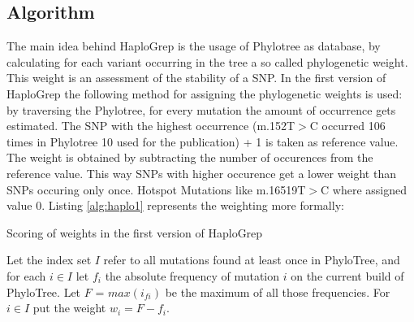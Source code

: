 \subsection{Algorithm}\label{haplo:alg}
The main idea behind HaploGrep is the usage of Phylotree as database, by calculating for each variant occurring in the tree a so called phylogenetic weight. This weight is an assessment of the stability of a SNP. In the first version of HaploGrep the following method for assigning the phylogenetic weights is used: by traversing the Phylotree, for every mutation the amount of occurrence gets estimated. The SNP with the highest occurrence (m.152T$>$C occurred 106 times in Phylotree 10 used for the publication) + 1 is taken as reference value. The weight is obtained by subtracting the number of occurences from the reference value. This way SNPs with higher occurence get a lower weight than SNPs occuring only once. Hotspot Mutations like m.16519T$>$C where assigned value 0. Listing \ref{alg:haplo1} represents the weighting more formally:

\begin{algorithm}\label{hg:algorithm}
\caption{Scoring of weights in the first version of HaploGrep}
\label{alg:haplo1}
Let the index set $I$ refer to all mutations found at least once in PhyloTree, and for each $i \in I$ let $f_i$ the absolute frequency of mutation $i$ on the current build of PhyloTree. Let $F$ = $max(i_{fi})$ be the maximum of all those frequencies. For $i \in I$ put the weight $w_i = F-f_i$. 
\end{algorithm}

